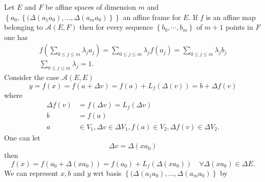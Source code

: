 \documentclass[aps,preprint]{revtex4}%
\begin{document}
Let $E$ and $F$ be affine spaces of dimension $m$ and $\left\{  a_{0},\left\{
(\Delta\left(  a_{1}a_{0}\right)  ,...,\Delta\left(  a_{m}a_{0}\right)
\right\}  \right\}  $ an affine frame for $E.$ If $f$ is an affine map
belonging to $\mathcal{A}\left(  E,F\right)  $ then for every sequence
$\left\{  b_{0},\cdots,b_{m}\right\}  $ of $m+1$ points in $F$ one has
\begin{gather}
f\left(  \sum_{0\leq j\leq m}\lambda_{j}a_{j}\right)  =\sum_{0\leq j\leq
m}\lambda_{j}f\left(  a_{j}\right)  =\sum_{0\leq j\leq m}\lambda_{j}b_{j}\\
\sum_{0\leq j\leq m}\lambda_{j}=1.
\end{gather}
Consider the case $\mathcal{A}\left(  E,E\right)  $%
\begin{equation}
y=f\left(  x\right)  =f\left(  a+\Delta v\right)  =f\left(  a\right)
+L_{f}\left(  \Delta\left(  v\right)  \right)  =b+\Delta f\left(  v\right)
\end{equation}
where
\begin{align}
\Delta f\left(  v\right)   &  =f\left(  \Delta v\right)  =L_{f}\left(  \Delta
v\right) \\
b  &  =f\left(  a\right) \\
a  &  \in V_{1},\Delta v\in\Delta V_{1},f\left(  a\right)  \in V_{2},\Delta
f\left(  v\right)  \in\Delta V_{2}.
\end{align}
One can let
\begin{equation}
\Delta v=\Delta\left(  xa_{0}\right)
\end{equation}
then
\begin{equation}
f\left(  x\right)  =f\left(  a_{0}+\Delta\left(  xa_{0}\right)  \right)
=f\left(  a_{0}\right)  +L_{f}\left(  \Delta\left(  xa_{0}\right)  \right)
\quad\forall\Delta\left(  xa_{0}\right)  \in\Delta E.
\end{equation}
We can represent $x,b$ and $y$ wrt basis $\left\{  (\Delta\left(  a_{1}%
a_{0}\right)  ,...,\Delta\left(  a_{m}a_{0}\right)  \right\}  $ by
\end{document}
